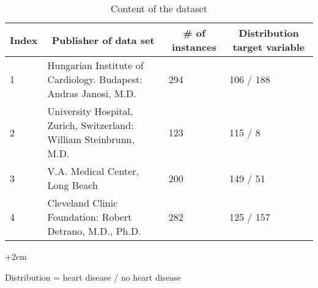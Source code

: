 \begin{table}[]
\begin{adjustwidth}{-2cm}{}
\begin{footnotesize}
\begin{tabular}{|l|l|l|l|}
\hline
\textbf{Index} & \multicolumn{1}{c|}{\textbf{Publisher of data set}}                & \multicolumn{1}{c|}{\textbf{\# of instances}} & \multicolumn{1}{c|}{\textbf{Distribution target variable}} \\ \hline
1              & Hungarian Institute of Cardiology. Budapest: Andras Janosi, M.D.   & 294                                           & 106 / 188                                                                                          \\ \hline
2              & University Hospital, Zurich, Switzerland: William Steinbrunn, M.D. & 123                                           & 115 / 8                                                                                            \\ \hline
3              & V.A. Medical Center, Long Beach                                    & 200                                           & 149 / 51                                                                                           \\ \hline
4              & Cleveland Clinic Foundation: Robert Detrano, M.D., Ph.D.           & 282                                           & 125 / 157                                                                                          \\ \hline
\end{tabular}
\begin{adjustwidth}{+2cm}{}
\begin{center}
\centering
Distribution = heart disease / no heart disease
\end{center}
\end{adjustwidth}

\caption{Content of the dataset} 
\label{table:datasets}
\end{footnotesize}
\end{adjustwidth}
\end{table}

